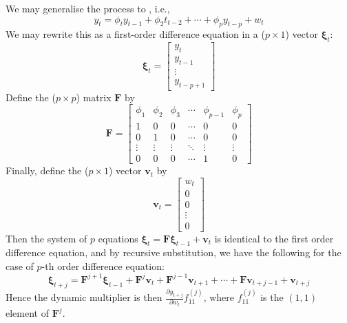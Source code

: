 We may generalise the process to , i.e.,
\begin{equation*}
y_t = \phi_t y_{t-1} + \phi_2 t_{t-2} + \cdots + \phi_p y_{t-p} + w_t \nonumber
\end{equation*}
We may rewrite this as a first-order difference equation in a ($p \times 1$) vector $\bm{\xi}_t$:
\begin{equation*}
\bm{\xi}_t = 
\begin{bmatrix}
y_t \\
y_{t-1} \\ 
\vdots \\
y_{t-p+1}
\end{bmatrix} \nonumber
\end{equation*}
Define the ($p \times p$) matrix $\bm{F}$ by
\begin{equation*}
\bm{F} =
\begin{bmatrix}
\phi_1 & \phi_2 & \phi_3 & \cdots & \phi_{p-1} & \phi_p \\
1 & 0 & 0 & \cdots & 0 & 0 \\
0 & 1 & 0 & \cdots & 0 & 0 \\
\vdots & \vdots & \vdots & \ddots & \vdots & \vdots \\
0 & 0 & 0 & \cdots & 1 & 0
\end{bmatrix} \nonumber
\end{equation*}
Finally, define the ($p \times 1$) vector $\bm{v}_t$ by
\begin{equation*}
\bm{v}_t =
\begin{bmatrix}
w_t \\
0 \\
0 \\
\vdots \\
0
\end{bmatrix} \nonumber
\end{equation*}
Then the system of $p$ equations $\bm{\xi}_t = \bm{F} \bm{\xi}_{t-1} + \bm{v}_t$ is identical to the first order difference equation, and by recursive substitution, we have the following for the case of $p$-th order difference equation:
\begin{equation*}
\bm{\xi}_{t + j} = \bm{F}^{j+1} \bm{\xi}_{t-1} + \bm{F}^{j} \bm{v}_{t} + \bm{F}^{j-1} \bm{v}_{t+1} + \cdots + \bm{F} \bm{v}_{t+j-1} + \bm{v}_{t+j} \nonumber
\end{equation*}
Hence the dynamic multiplier is then $\frac{\partial y_{t+j}}{\partial w_t} f^{(j)}_{11}$, where $f^{(j)}_{11}$ is the $(1,1)$ element of $\bm{F}^j$.

